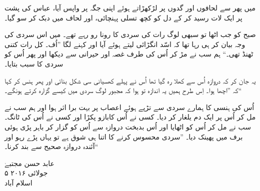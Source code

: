 \documentclass{article}
\begin{document}
میں پھر سے لحافوں اور گدوں پر لڑکھڑاتے ہوئے اپنی جگہ پر واپس آیا، عباس کی پشت پر ایک لات رسید کر کے دل کو کچھ تسلی پہنچائی، اور لحاف میں دبک کر سو گیا۔

صبح کو جب اٹھا تو سبھی لوگ رات کی سردی کا رونا رو رہے تھے۔ میں اس سردی کی وجہ بیان کر ہی رہا تھا کہ اسّد انگڑائی لیتے ہوئے آیا اور کہنے لگا ''اُف۔ کل رات کتنی ٹھنڈ تھی۔`` ہم سب نے مڑ کر اُس کی طرف غصہ اور حیرانی سے دیکھا اور پھر اُس کو سردی کا سبب بتایا۔

یہ جان کر کہ دروازہ اُس سے کھلا رہ گیا تھا اُس نے پہلے کھسیانی سی شکل بنائی اور پھر ہنس کر کہا کہ ''اچھا ہوا۔ اِس طرح ہمیں یہ اندازہ تو ہوا کہ مجبور لوگ سردی میں کیسے گزارہ کرتے ہونگے۔``

اُس کی ہنسی کا ہمارے سردی سے تڑپے ہوئے اعصاب پر بہت برا اثر ہوا اور ہم سب نے مل کر اُس پر ایک دم یلغار کر دیا۔ کسی نے اُس کابازو پکڑا اور کسی نے اُس کی ٹانگ۔ سب نے مل کر اُس کو اٹھایا اور اُس بدبخت دروازہ سے اُس کو گزار کر باہر پڑی ہوئی برف میں پھینک دیا۔ ''سردی محسوس کرنے کا اتنا ہی شوق ہے تو یہاں پڑے رہو اور آئندہ دروازہ صحیح سے بند کرنا۔``


\vspace{\baselineskip}
\begin{flushleft}
   عابد حسن مجتبےٰ\\
   ۵ جولائی ۲۰۱۶\\
   اسلام آباد
\end{flushleft}
\end{document}
